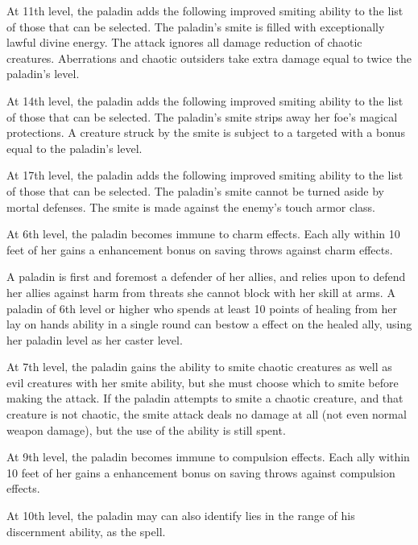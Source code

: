 At 11th level, the paladin adds the following improved smiting ability to the list of those that can be selected.
 The paladin's smite is filled with exceptionally lawful divine energy. The attack ignores all damage reduction of chaotic creatures. Aberrations and chaotic outsiders take extra damage equal to twice the paladin's level.

At 14th level, the paladin adds the following improved smiting ability to the list of those that can be selected.
 The paladin's smite strips away her foe's magical protections. A creature struck by the smite is subject to a targeted  with a bonus equal to the paladin's level.

At 17th level, the paladin adds the following improved smiting ability to the list of those that can be selected.
 The paladin's smite cannot be turned aside by mortal defenses. The smite is made against the enemy's touch armor class.

 At 6th level, the paladin becomes immune to charm effects. Each ally within 10 feet of her gains a  enhancement bonus on saving throws against charm effects.

 A paladin is first and foremost a defender of her allies, and relies upon  to defend her allies against harm from threats she cannot block with her skill at arms. A paladin of 6th level or higher who spends at least 10 points of healing from her lay on hands ability in a single round can bestow a  effect on the healed ally, using her paladin level as her caster level.

 At 7th level, the paladin gains the ability to smite chaotic creatures as well as evil creatures with her smite ability, but she must choose which to smite before making the attack. If the paladin attempts to smite a chaotic creature, and that creature is not chaotic, the smite attack deals no damage at all (not even normal weapon damage), but the use of the ability is still spent.

 At 9th level, the paladin becomes immune to compulsion effects. Each ally within 10 feet of her gains a  enhancement bonus on saving throws against compulsion effects.

 At 10th level, the paladin may can also identify lies in the range of his discernment ability, as the  spell.

